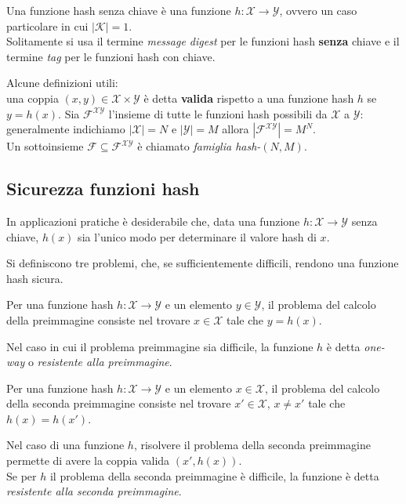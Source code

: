 \noindent Una funzione hash senza chiave è una funzione $h: \mathcal{X} \to \mathcal{Y}$, ovvero un caso particolare in cui $|\mathcal{K}| = 1$. \\ Solitamente si usa il termine \emph{message digest} per le funzioni hash \textbf{senza} chiave e il termine \emph{tag} per le funzioni hash con chiave. 

\vspace{0.2cm} \noindent Alcune definizioni utili: \\ una coppia $(x,y) \in \mathcal{X} \times \mathcal{Y}$ è detta \textbf{valida} rispetto a una funzione hash $h$ se $y = h(x)$. Sia $\mathcal{F}^{\mathcal{X}\mathcal{Y}}$ l'insieme di tutte le funzioni hash possibili da $\mathcal{X}$ a $\mathcal{Y}$: generalmente indichiamo $|\mathcal{X}| = N$ e $|\mathcal{Y}| = M$ allora $|\mathcal{F}^{\mathcal{X}\mathcal{Y}}| = M^N$. \\ Un sottoinsieme $\mathcal{F} \subseteq \mathcal{F}^{\mathcal{X}\mathcal{Y}}$ è chiamato \textit{famiglia hash-}$(N,M)$. 

\subsection{Sicurezza funzioni hash}
In applicazioni pratiche è desiderabile che, data una funzione $h: \mathcal{X} \to \mathcal{Y}$ senza chiave, $h(x)$ sia l'unico modo per determinare il valore hash di $x$.

\noindent Si definiscono tre problemi, che, se sufficientemente difficili, rendono una funzione hash sicura. 

\begin{definition}
    Per una funzione hash $h: \mathcal{X} \to \mathcal{Y}$ e un elemento $y \in \mathcal{Y}$, il problema del calcolo della preimmagine consiste nel trovare $x \in \mathcal{X}$ tale che $y = h(x)$.
\end{definition}
\noindent
Nel caso in cui il problema preimmagine sia difficile, la funzione $h$ è detta \emph{one-way} o \emph{resistente alla preimmagine}.
\vspace{1em}
\begin{definition}
    Per una funzione hash $h: \mathcal{X} \to \mathcal{Y}$ e un elemento $x \in \mathcal{X}$, il problema del calcolo della seconda preimmagine consiste nel trovare $x' \in \mathcal{X}$, $x \neq x'$ tale che $h(x) = h(x')$.
\end{definition}

\noindent Nel caso di una funzione $h$, risolvere il problema della seconda preimmagine permette di avere la coppia valida $(x',h(x))$. \\ Se per $h$ il problema della seconda preimmagine è difficile, la funzione è detta \emph{resistente alla seconda preimmagine}.

